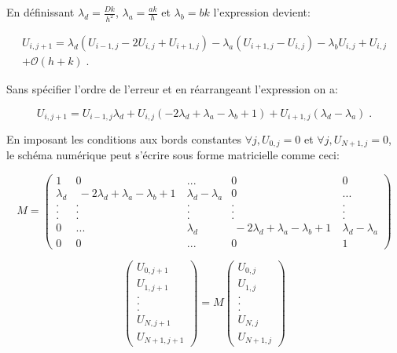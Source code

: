\documentclass[a4paper, 12pt]{report}
\begin{document}
En définissant $\lambda_d = \frac{Dk}{h^2}$, $\lambda_a = \frac{ak}{h}$ et
$\lambda_b = bk$ l'expression devient:

\begin{multline}
  U_{i,j+1} = \lambda_d (U_{i-1,j} - 2 U_{i,j} + U_{i+1,j}) - \lambda_a (U_{i+1,j} - U_{i,j}) - \lambda_b U_{i,j} + U_{i,j}\\
  + \mathcal{O}(h+k) \;.
\end{multline}

Sans spécifier l'ordre de l'erreur et en réarrangeant l'expression on a:

\begin{equation}
  U_{i,j+1} = U_{i-1,j} \lambda_d + U_{i,j} (-2 \lambda_d + \lambda_a - \lambda_b +1) + U_{i+1, j} (\lambda_d - \lambda_a)\;.
\end{equation}

En imposant les conditions aux bords constantes $\forall j, U_{0,j} = 0$
et $\forall j, U_{N+1,j} = 0$, le schéma numérique peut s'écrire
sous forme matricielle comme ceci:

\begin{equation}
  M =
  \begin{pmatrix}
     1 & 0 & ... & 0 & 0 \\
     \lambda_d & \ -2 \lambda_d + \lambda_a - \lambda_b + 1 \ & \lambda_d-\lambda_a &  0 & ...\\
     . & . & . &  . & .\\
     . & . & . &  . & .\\
     . & . & . &  . & .\\
     0 & ... & \lambda_d & \ -2 \lambda_d + \lambda_a - \lambda_b + 1 \ & \lambda_d-\lambda_a\\
     0 & 0 & ... & 0 & 1
  \end{pmatrix}
\end{equation}

\begin{equation}
\begin{pmatrix}
   U_{0,j+1} \\
   U_{1,j+1} \\
   .\\
   .\\
   .\\
   U_{N,j+1}\\
   U_{N+1,j+1}
\end{pmatrix}
=
M
\begin{pmatrix}
   U_{0,j} \\
   U_{1,j} \\
   .\\
   .\\
   .\\
   U_{N,j}\\
   U_{N+1,j}
\end{pmatrix}
\end{equation}
\end{document}
